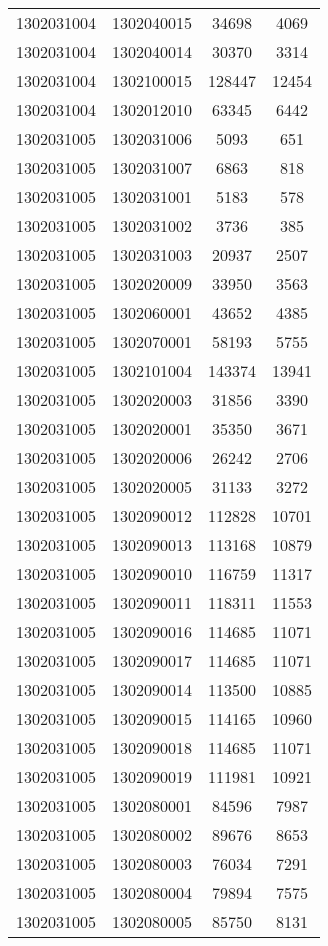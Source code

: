 \begin{longtable}{llcc}
1302031004 & 1302040015 & 34698 & 4069\\
1302031004 & 1302040014 & 30370 & 3314\\
1302031004 & 1302100015 & 128447 & 12454\\
1302031004 & 1302012010 & 63345 & 6442\\
1302031005 & 1302031006 & 5093 & 651\\
1302031005 & 1302031007 & 6863 & 818\\
1302031005 & 1302031001 & 5183 & 578\\
1302031005 & 1302031002 & 3736 & 385\\
1302031005 & 1302031003 & 20937 & 2507\\
1302031005 & 1302020009 & 33950 & 3563\\
1302031005 & 1302060001 & 43652 & 4385\\
1302031005 & 1302070001 & 58193 & 5755\\
1302031005 & 1302101004 & 143374 & 13941\\
1302031005 & 1302020003 & 31856 & 3390\\
1302031005 & 1302020001 & 35350 & 3671\\
1302031005 & 1302020006 & 26242 & 2706\\
1302031005 & 1302020005 & 31133 & 3272\\
1302031005 & 1302090012 & 112828 & 10701\\
1302031005 & 1302090013 & 113168 & 10879\\
1302031005 & 1302090010 & 116759 & 11317\\
1302031005 & 1302090011 & 118311 & 11553\\
1302031005 & 1302090016 & 114685 & 11071\\
1302031005 & 1302090017 & 114685 & 11071\\
1302031005 & 1302090014 & 113500 & 10885\\
1302031005 & 1302090015 & 114165 & 10960\\
1302031005 & 1302090018 & 114685 & 11071\\
1302031005 & 1302090019 & 111981 & 10921\\
1302031005 & 1302080001 & 84596 & 7987\\
1302031005 & 1302080002 & 89676 & 8653\\
1302031005 & 1302080003 & 76034 & 7291\\
1302031005 & 1302080004 & 79894 & 7575\\
1302031005 & 1302080005 & 85750 & 8131\\

\end{longtable}
